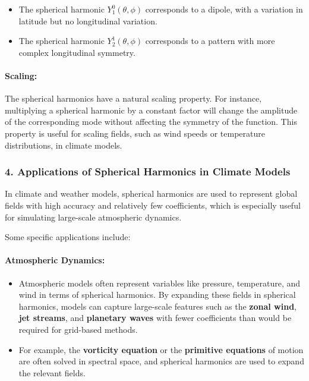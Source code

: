 \begin{itemize}
	\item The spherical harmonic $Y_1^0(\theta,\phi)$ corresponds to a dipole, with a variation in latitude but no longitudinal variation.
	\item The spherical harmonic $Y_2^1(\theta,\phi)$ corresponds to a pattern with more complex longitudinal symmetry.
\end{itemize}

\paragraph{\textbf{Scaling}:}

The spherical harmonics have a natural scaling property. For instance, multiplying a spherical harmonic by a constant factor will change the amplitude of the corresponding mode without affecting the symmetry of the function. This property is useful for scaling fields, such as wind speeds or temperature distributions, in climate models.

\subsubsection{4. \textbf{Applications of Spherical Harmonics in Climate Models}}

In climate and weather models, spherical harmonics are used to represent global fields with high accuracy and relatively few coefficients, which is especially useful for simulating large-scale atmospheric dynamics.

Some specific applications include:

\paragraph{\textbf{Atmospheric Dynamics}:}

\begin{itemize}
	\item Atmospheric models often represent variables like pressure, temperature, and wind in terms of spherical harmonics. By expanding these fields in spherical harmonics, models can capture large-scale features such as the \textbf{zonal wind}, \textbf{jet streams}, and \textbf{planetary waves} with fewer coefficients than would be required for grid-based methods.
	\item For example, the \textbf{vorticity equation} or the \textbf{primitive equations} of motion are often solved in spectral space, and spherical harmonics are used to expand the relevant fields.
\end{itemize}

